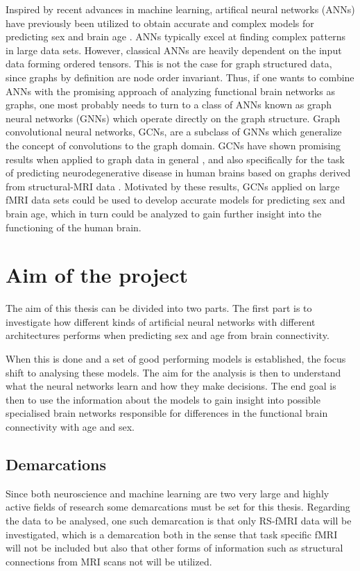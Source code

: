 Inspired by recent advances in machine learning, artifical neural networks (ANNs) have previously been utilized to obtain accurate and complex models for predicting sex and brain age \cite{amoroso_multiplex_age, stankeviciute, arslan}. ANNs typically excel at finding complex patterns in large data sets. However, classical ANNs are heavily dependent on the input data forming ordered tensors. This is not the case for graph structured data, since graphs by definition are node order invariant. Thus, if one wants to combine ANNs with the promising approach of analyzing functional brain networks as graphs, one most probably needs to turn to a class of ANNs known as graph neural networks (GNNs)  which operate directly on the graph structure. Graph convolutional neural networks, GCNs, are a subclass of GNNs which generalize the concept of convolutions to the graph domain. GCNs have shown promising results when applied to graph data in general \cite{kipf_semi_supervised, kipf_vae, wu_review}, and also specifically for the task of predicting neurodegenerative disease in human brains based on graphs derived from structural-MRI data \cite{jansson_sandstrom}. Motivated by these results, GCNs applied on large fMRI data sets could be used to develop accurate models for predicting sex and brain age, which in turn could be analyzed to gain further insight into the functioning of the human brain.



\section{Aim of the project}
The aim of this thesis can be divided into two parts. The first part is to investigate how different kinds of artificial neural networks with different architectures performs when predicting sex and age from brain connectivity.

When this is done and a set of good performing models is established, the focus shift to analysing these models. The aim for the analysis is then to understand what the neural networks learn and how they make decisions. The end goal is then to use the information about the models to gain insight into possible specialised brain networks responsible for differences in the functional brain connectivity with age and sex.

\subsection{Demarcations}
Since both neuroscience and machine learning are two very large and highly active fields of research some demarcations must be set for this thesis. Regarding the data to be analysed, one such demarcation is that only RS-fMRI data will be investigated, which is a demarcation both in the sense that task specific fMRI will not be included but also that other forms of information such as structural connections from MRI scans not will be utilized. 

